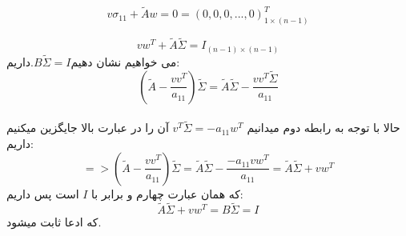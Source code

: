 \[
    v\sigma_{11}+\tilde{A}w = 0 = (0,0,0,...,0)^{T}_{1\times(n-1)}
\]

\[
    vw^T+\tilde{A}\tilde{\Sigma} = I_{(n-1)\times(n-1)}
\]
می خواهیم نشان دهیم$B\tilde{\Sigma} = I$.داریم:\\
\[
    (\tilde{A}-\frac{vv^T}{a_{11}})\tilde{\Sigma}  
    =\tilde{A}\tilde{\Sigma} -\frac{vv^T\tilde{\Sigma}}{a_{11}}
\]\\
حالا با توجه به رابطه دوم میدانیم $v^T\tilde{\Sigma} = -a_{11}w^T$
آن را در عبارت بالا جایگزین میکنیم داریم:\\
\[
    =>(\tilde{A}-\frac{vv^T}{a_{11}})\tilde{\Sigma}  
    =\tilde{A}\tilde{\Sigma} -\frac{-a_{11}vw^T}{a_{11}}
    =\tilde{A}\tilde{\Sigma} +vw^T
\]
که همان عبارت چهارم و برابر با $I$ است پس داریم:\\
\[
    \tilde{A}\tilde{\Sigma} +vw^T = B\tilde{\Sigma} = I
\]
که ادعا ثابت میشود.\\\\